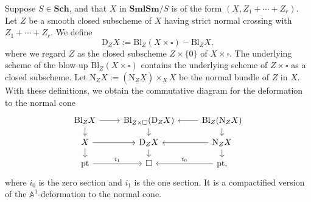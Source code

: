 \documentclass[11pt, a4paper]{amsart}
\theoremstyle{definition}
\numberwithin{equation}{subsection}
\newcommand{\Sch}{\mathbf{Sch}}
\newcommand{\SmlSm}{\mathbf{SmlSm}}
\newcommand{\pt}[1]{\mathrm{\pt}_{#1}}
\newcommand{\Blow}{{\mathrm{Bl}}}
\newcommand{\Normal}{{\mathrm{N}}}
\newcommand{\Deform}{{\mathrm{D}}}
\renewcommand{\ul}{\underline}
\newcommand{\boxx}{\square}
\def\pt{\operatorname{pt}}
\begin{document}
Suppose $S\in \Sch$, and that $X$ in $\SmlSm/S$ is of the form $(\ul{X},Z_1+\cdots+Z_r)$. Let 
$Z$ be a smooth closed subscheme of $X$ having strict normal crossing with $Z_1+\cdots+Z_r$. 
We define\index[notation]{DZX @ $\Deform_Z X$}
\[
\Deform_Z X
:=
\Blow_{Z}(X\times \boxx)-\Blow_Z X,
\]
where we regard $Z$ as the closed subscheme $Z\times \{0\}$ of $X\times \boxx$.
The underlying scheme of the blow-up $\Blow_Z (X\times \boxx)$ contains the underlying scheme of $Z\times \boxx$ as a closed subscheme.
Let $\Normal_Z X:=(\Normal_{\ul{Z}}\ul{X})\times_{\ul{X}}X$ 
be the normal bundle\index[notation]{NZX @ $\Normal_Z X$} of $Z$ in $X$.
With these definitions, 
we obtain the commutative diagram for the deformation to the normal cone
\begin{equation}
\label{Thom.1.6}
\begin{tikzcd}[row sep=small]
\Blow_Z X\ar[r]\ar[d]&
\Blow_{Z\times \boxx}(\Deform_Z X)\ar[r,leftarrow]\ar[d]&
\Blow_Z (\Normal_Z X)\ar[d]
\\
X\ar[r]\ar[d]&
\Deform_Z X\ar[r,leftarrow]\ar[d]&
\Normal_Z X\ar[d]
\\
\pt\ar[r,"i_1"]&
\boxx\ar[r,leftarrow,"i_0"]&
\pt,
\end{tikzcd}
\end{equation}
where $i_0$ is the zero section and $i_1$ is the one section. It is a compactified version of the $\mathbb{A}^1$-deformation to the normal cone. 
\end{document}

